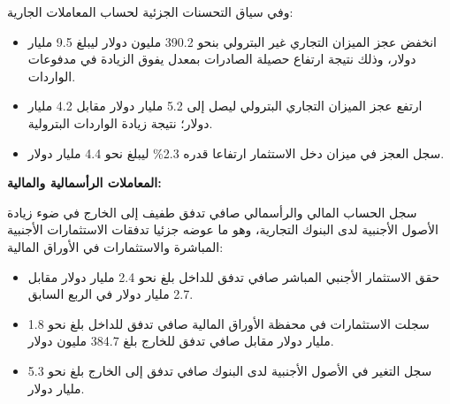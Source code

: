وفي سياق التحسنات الجزئية لحساب المعاملات الجارية:
\begin{itemize}
    \item انخفض عجز الميزان التجاري غير البترولي بنحو 390.2 مليون دولار ليبلغ 9.5 مليار دولار، وذلك نتيجة ارتفاع حصيلة الصادرات بمعدل يفوق الزيادة في مدفوعات الواردات.
    \item ارتفع عجز الميزان التجاري البترولي ليصل إلى 5.2 مليار دولار مقابل 4.2 مليار دولار؛ نتيجة زيادة الواردات البترولية.
    \item سجل العجز في ميزان دخل الاستثمار ارتفاعا قدره 2.3\% ليبلغ نحو 4.4 مليار دولار.
\end{itemize}

\vspace{0.4em}
\textbf{المعاملات الرأسمالية والمالية:}

سجل الحساب المالي والرأسمالي صافي تدفق طفيف إلى الخارج في ضوء زيادة الأصول الأجنبية لدى البنوك التجارية، وهو ما عوضه جزئيا تدفقات الاستثمارات الأجنبية المباشرة والاستثمارات في الأوراق المالية:
\begin{itemize}
    \item حقق الاستثمار الأجنبي المباشر صافي تدفق للداخل بلغ نحو 2.4 مليار دولار مقابل 2.7 مليار دولار في الربع السابق.
    \item سجلت الاستثمارات في محفظة الأوراق المالية صافي تدفق للداخل بلغ نحو 1.8 مليار دولار مقابل صافي تدفق للخارج بلغ 384.7 مليون دولار.
    \item سجل التغير في الأصول الأجنبية لدى البنوك صافي تدفق إلى الخارج بلغ نحو 5.3 مليار دولار.
\end{itemize}
